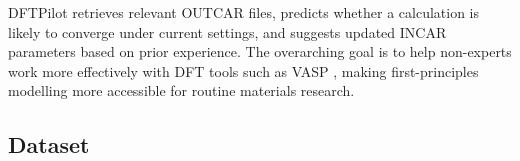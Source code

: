 DFTPilot retrieves relevant OUTCAR files, predicts whether a calculation is likely to converge under current settings, and suggests updated INCAR parameters based on prior experience. The overarching goal is to help non-experts work more effectively with DFT tools such as VASP \cite{kresse1993ab, kresse1996efficient}, making first-principles modelling more accessible for routine materials research.

%
%

\subsection*{Dataset}

